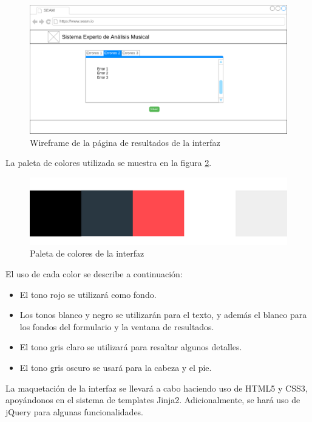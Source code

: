 \begin{figure}[H]
	\centering
	\includegraphics[scale=0.4]{imagenes/interfaz2.png}
	\caption{Wireframe de la página de resultados de la interfaz}
	\label{fig4.1.2.2}
\end{figure}

\bigskip
La paleta de colores utilizada se muestra en la figura \ref{fig4.1.2.3}.

\begin{figure}[H]
 	\centering
	\includegraphics[scale=0.2]{imagenes/paleta.png}
	\caption{Paleta de colores de la interfaz}
	\label{fig4.1.2.3}
\end{figure}

El uso de cada color se describe a continuación:

\begin{itemize}
	
	\item El tono rojo se utilizará como fondo.
	\item Los tonos blanco y negro se utilizarán para el texto, y además el blanco para los fondos del formulario y la ventana de resultados.
	\item El tono gris claro se utilizará para resaltar algunos detalles.
	\item El tono gris oscuro se usará para la cabeza y el pie.
\end{itemize}

La maquetación de la interfaz se llevará a cabo haciendo uso de HTML5 y CSS3, apoyándonos en el sistema de templates Jinja2. Adicionalmente, se hará uso de jQuery para algunas funcionalidades.

